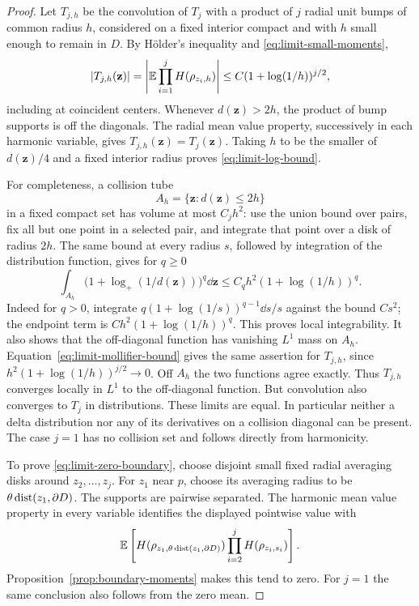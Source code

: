 \begin{proof}
Let \(T_{j,h}\) be the convolution of \(T_j\) with a product of
\(j\) radial unit bumps of common radius \(h\), considered on a
fixed interior compact and with \(h\) small enough to remain in
\(D\).  By H\"older's inequality and
\eqref{eq:limit-small-moments},
\begin{equation}
 |T_{j,h}(\mathbf z)|
   =\left|\mathbb E\prod_{i=1}^jH(\rho_{z_i,h})\right|
   \le C(1+\log(1/h))^{j/2},
 \label{eq:limit-mollifier-bound}
\end{equation}
including at coincident centers.  Whenever \(d(\mathbf z)>2h\),
the product of bump supports is off the diagonals.  The radial mean
value property, successively in each harmonic variable, gives
\(T_{j,h}(\mathbf z)=T_j(\mathbf z)\).
Taking \(h\) to be the smaller of \(d(\mathbf z)/4\) and a fixed
interior radius proves \eqref{eq:limit-log-bound}.

For completeness, a collision tube
\[
       A_h=\{\mathbf z:d(\mathbf z)\le2h\}
\]
in a fixed compact set has volume at most \(C_jh^2\): use the
union bound over pairs, fix all but one point in a selected pair,
and integrate that point over a disk of radius \(2h\).
The same bound at every radius \(s\), followed by integration of
the distribution function, gives for \(q\ge0\)
\[
 \int_{A_h}\bigl(1+\log_+(1/d(\mathbf z))\bigr)^q\dd\mathbf z
       \le C_qh^2(1+\log(1/h))^q.
\]
Indeed for \(q>0\), integrate
\(q(1+\log(1/s))^{q-1}\dd s/s\) against the bound \(Cs^2\);
the endpoint term is \(Ch^2(1+\log(1/h))^q\).
This proves local integrability.  It also shows that the
off-diagonal function has vanishing \(L^1\) mass on \(A_h\).
Equation~\eqref{eq:limit-mollifier-bound} gives the same assertion
for \(T_{j,h}\), since \(h^2(1+\log(1/h))^{j/2}\to0\).
Off \(A_h\) the two functions agree exactly.  Thus \(T_{j,h}\)
converges locally in \(L^1\) to the off-diagonal function.
But convolution also converges to \(T_j\) in distributions.
These limits are equal.  In particular neither a delta distribution
nor any of its derivatives on a collision diagonal can be present.
The case \(j=1\) has no collision set and follows directly from
harmonicity.

To prove \eqref{eq:limit-zero-boundary}, choose disjoint small fixed
radial averaging disks around \(z_2,\ldots,z_j\).
For \(z_1\) near \(p\), choose its averaging radius to be
\(\theta\operatorname{dist}(z_1,\partial D)\).
The supports are pairwise separated.  The harmonic mean value
property in every variable identifies the displayed pointwise
value with
\[
 \mathbb E\left[H(\rho_{z_1,\theta\operatorname{dist}(z_1,\partial D)})
                         \prod_{i=2}^jH(\rho_{z_i,s_i})\right].
\]
Proposition~\ref{prop:boundary-moments} makes this tend to zero.
For \(j=1\) the same conclusion also follows from the zero mean.
\end{proof}

